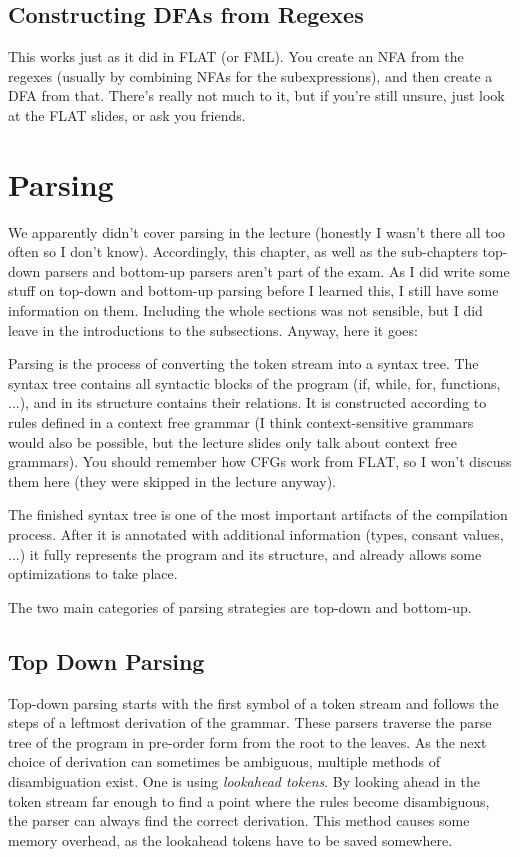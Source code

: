 \documentclass{article}
\begin{document}
\subsection{Constructing DFAs from Regexes}
This works just as it did in FLAT (or FML).
You create an NFA from the regexes (usually by combining NFAs for the subexpressions), and then create a DFA from that.
There's really not much to it, but if you're still unsure, just look at the FLAT slides, or ask you friends.


\section{Parsing}
We apparently didn't cover parsing in the lecture (honestly I wasn't there all too often so I don't know).
Accordingly, this chapter, as well as the sub-chapters top-down parsers and bottom-up parsers aren't part of the exam.
As I did write some stuff on top-down and bottom-up parsing before I learned this, I still have some information on them.
Including the whole sections was not sensible, but I did leave in the introductions to the subsections.
Anyway, here it goes:

Parsing is the process of converting the token stream into a syntax tree.
The syntax tree contains all syntactic blocks of the program (if, while, for, functions, ...), and in its structure contains their relations.
It is constructed according to rules defined in a context free grammar (I think context-sensitive grammars would also be possible, but the lecture slides only talk about context free grammars).
You should remember how CFGs work from FLAT, so I won't discuss them here (they were skipped in the lecture anyway).

The finished syntax tree is one of the most important artifacts of the compilation process.
After it is annotated with additional information (types, consant values, ...) it fully represents the program and its structure, and already allows some optimizations to take place.

The two main categories of parsing strategies are top-down and bottom-up.

\subsection{Top Down Parsing}
Top-down parsing starts with the first symbol of a token stream and follows the steps of a leftmost derivation of the grammar.
These parsers traverse the parse tree of the program in pre-order form from the root to the leaves.
As the next choice of derivation can sometimes be ambiguous, multiple methods of disambiguation exist.
One is using \emph{lookahead tokens}.
By looking ahead in the token stream far enough to find a point where the rules become disambiguous, the parser can always find the correct derivation.
This method causes some memory overhead, as the lookahead tokens have to be saved somewhere.
\end{document}
